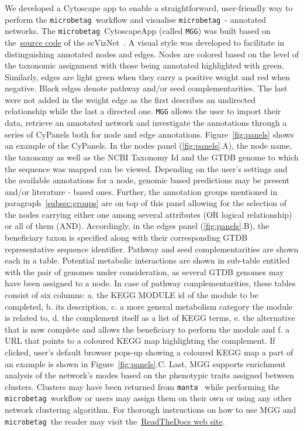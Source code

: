 \documentclass[sn-mathphys,Numbered]{sn-jnl}  %
\theoremstyle{thmstyleone}%
\theoremstyle{thmstyletwo}%
\theoremstyle{thmstylethree}%
\newcommand{\microbetag}{\texttt{microbetag }}
\begin{document}
        We developed a Cytoscape app to enable a straightforward, user-friendly way to perform the \microbetag workflow and visualise \microbetag - annotated networks.
        The \microbetag CytoscapeApp (called \texttt{MGG}) was built based on the~\href{https://github.com/RBVI/scNetViz}{source code} of the scVizNet~\cite{choudhary2021scnetviz}.
        A visual style was developed to facilitate in distinguishing annotated nodes and edges.
        Nodes are colored based on the level of the taxonomic assignment with those being annotated highlighted with green.
        Similarly, edges are light green when they carry a positive weight and red when negative. 
        Black edges denote pathway and/or seed complementarities.
        The last were not added in the weight edge as the first describes an undirected relationship while the last a directed one. 
        \texttt{MGG} allows the user to import their data, retrieve an annotated network and investigate the annotations through a series of CyPanels both for node and edge annotations.
        Figure~\ref{fig:panels} shows an example of the CyPanels.
        In the nodes panel (\ref{fig:panels}.A), the node name, the taxonomy as well as the NCBI Taxonomy Id and the GTDB genome to which the sequence was mapped can be viewed. 
        Depending on the user's settings and the available annotations for a node, genomic based predictions may be present and/or literature - based ones.
        Further, the annotation groups mentioned in paragraph~\ref{subsec:groups} are on top of this panel allowing for the selection of the nodes carrying either one among several attributes (OR logical relationship) or all of them (AND).
        Accordingly, in the edges panel (\ref{fig:panels}.B), the beneficiary taxon is specified along with their corresponding GTDB representative sequence identifier.
        Pathway and seed complementarities are shown each in a table.
        Potential metabolic interactions are shown in sub-table entitled with the pair of genomes under consideration, as several GTDB genomes may have been assigned to a node.
        In case of pathway complementarities, these tables consist of six columns: a. the KEGG MODULE id of the module to be completed, b. its description, c. a more general metabolism category the module is related to, d. the complement itself as a list of KEGG terms, e. the alternative that is now complete and allows the beneficiary to perform the module and f. a URL that points to a coloured KEGG map highlighting the complement.
        If clicked, user's default browser pops-up showing a coloured KEGG map a part of an example is shown in Figure~\ref{fig:panels}.C.
        Last, MGG supports enrichment analysis of the network's modes based on the phenotypic traits assigned between clusters. 
        Clusters may have been returned from \texttt{manta}~\cite{rottjers2020manta} while performing the \microbetag workflow or users may assign them on their own or using any other network clustering algorithm.
        For thorough instructions on how to use MGG and \microbetag the reader may visit the~\href{https://hariszaf.github.io/microbetag/docs/cytoApp/}{ReadTheDocs web site}.
\end{document}
